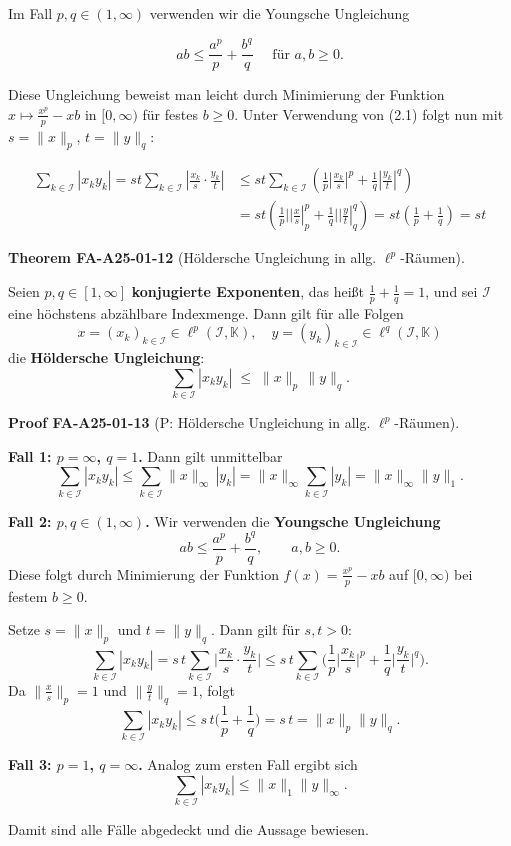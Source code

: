 \documentclass[10pt, letterpaper]{article}
\newcommand{\CustomHeading}[3]{%
  \par\medskip\noindent%
  \textbf{#1 #2} \textnormal{(#3)}.\enskip%
}
\newenvironment{THEO}[2]{\begin{unitbox}\CustomHeading{Theorem}{#1}{#2}}{\end{unitbox}}
\newenvironment{PROOF}[2]{\begin{unitbox}\CustomHeading{Proof}{#1}{#2}}{\end{unitbox}}
\begin{document}
Im Fall $p, q \in(1, \infty)$ verwenden wir die Youngsche Ungleichung

$$
a b \leq \frac{a^{p}}{p}+\frac{b^{q}}{q} \quad \text { für } a, b \geq 0 .
$$

Diese Ungleichung beweist man leicht durch Minimierung der Funktion $x \mapsto \frac{x^{p}}{p}-x b$ in $[0, \infty)$ für festes $b \geq 0$. Unter Verwendung von (2.1) folgt nun mit $s=\|x\|_{p}$, $t=\|y\|_{q}:$

$$
\begin{aligned}
\sum_{k \in \mathcal{I}}\left|x_{k} y_{k}\right|=s t \sum_{k \in \mathcal{I}}\left|\frac{x_{k}}{s} \cdot \frac{y_{k}}{t}\right| & \leq s t \sum_{k \in \mathcal{I}}\left(\frac{1}{p}\left|\frac{x_{k}}{s}\right|^{p}+\frac{1}{q}\left|\frac{y_{k}}{t}\right|^{q}\right) \\
& =s t\left(\left.\frac{1}{p}| | \frac{x}{s}\right|_{p} ^{p}+\left.\frac{1}{q}| | \frac{y}{t}\right|_{q} ^{q}\right)=s t\left(\frac{1}{p}+\frac{1}{q}\right)=s t
\end{aligned}
$$




\begin{THEO}{FA-A25-01-12}{Höldersche Ungleichung in allg. $\ell^p$-Räumen}
Seien $p,q\in[1,\infty]$ \textbf{konjugierte Exponenten}, das heißt $\tfrac{1}{p}+\tfrac{1}{q}=1$, und sei $\mathcal{I}$ eine höchstens abzählbare Indexmenge.  
Dann gilt für alle Folgen 
\[
x=(x_k)_{k\in\mathcal{I}}\in\ell^{p}(\mathcal{I},\mathbb{K}), 
\quad
y=(y_k)_{k\in\mathcal{I}}\in\ell^{q}(\mathcal{I},\mathbb{K})
\]
die \textbf{Höldersche Ungleichung}:
\[
\boxed{
\sum_{k\in\mathcal{I}}|x_k y_k|
\;\le\;
\|x\|_{p}\,\|y\|_{q}.
}
\]
\end{THEO}



\begin{PROOF}{FA-A25-01-13}{P: Höldersche Ungleichung in allg. $\ell^p$-Räumen}
\textbf{Fall 1: $p=\infty$, $q=1$.}  
Dann gilt unmittelbar
\[
\sum_{k\in\mathcal{I}}|x_k y_k|
\le
\sum_{k\in\mathcal{I}}\|x\|_{\infty}\,|y_k|
=\|x\|_{\infty}\sum_{k\in\mathcal{I}}|y_k|
=\|x\|_{\infty}\|y\|_{1}.
\]

\medskip
\textbf{Fall 2: $p,q\in(1,\infty)$.}  
Wir verwenden die \textbf{Youngsche Ungleichung}
\[
ab\le \frac{a^{p}}{p}+\frac{b^{q}}{q},\qquad a,b\ge 0.
\]
Diese folgt durch Minimierung der Funktion 
$f(x)=\tfrac{x^{p}}{p}-xb$ auf $[0,\infty)$ bei festem $b\ge0$.

Setze $s=\|x\|_{p}$ und $t=\|y\|_{q}$.  
Dann gilt für $s,t>0$:
\[
\sum_{k\in\mathcal{I}}|x_k y_k|
=s\,t\sum_{k\in\mathcal{I}}\Big|\frac{x_k}{s}\cdot\frac{y_k}{t}\Big|
\le s\,t\sum_{k\in\mathcal{I}}
\Big(
\frac{1}{p}\Big|\frac{x_k}{s}\Big|^{p}
+\frac{1}{q}\Big|\frac{y_k}{t}\Big|^{q}
\Big).
\]
Da $\|\frac{x}{s}\|_{p}=1$ und $\|\frac{y}{t}\|_{q}=1$, folgt
\[
\sum_{k\in\mathcal{I}}|x_k y_k|
\le s\,t\Big(\frac{1}{p}+\frac{1}{q}\Big)
=s\,t=\|x\|_{p}\|y\|_{q}.
\]

\medskip
\textbf{Fall 3: $p=1$, $q=\infty$.}  
Analog zum ersten Fall ergibt sich
\[
\sum_{k\in\mathcal{I}}|x_k y_k|
\le
\|x\|_{1}\|y\|_{\infty}.
\]

Damit sind alle Fälle abgedeckt und die Aussage bewiesen.
\end{PROOF}
\end{document}
